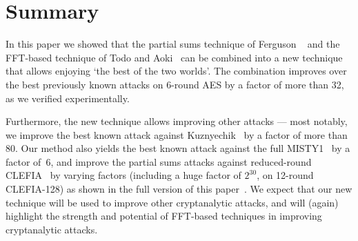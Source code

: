\section{Summary}\label{sec:summary}

In this paper we showed that the partial sums technique of Ferguson \etal~\cite{FSE:FKLSSWW00} and the FFT-based technique of Todo and Aoki~\cite{CANS:TodAok14} can be combined into a new technique that allows enjoying `the best of the two worlds'. The combination improves over the best previously known attacks on 6-round AES by a factor of more than 32, as we verified experimentally. 

Furthermore, the new technique allows improving other attacks --- most notably, we improve the best known attack against Kuznyechik~\cite{Kuznyechik} by a factor of more than 80. Our method also yields the best known attack against the full MISTY1~\cite{MISTY1} by a factor of~6, and improve the partial sums attacks against reduced-round CLEFIA~\cite{CLEFIA} by varying factors (including a huge factor of $2^{30}$, on 12-round CLEFIA-128) as shown in the full version of this paper~\cite{fullversion}. We expect that our new technique will be used to improve other cryptanalytic attacks, and will (again) highlight the strength and potential of FFT-based techniques in improving cryptanalytic attacks.
